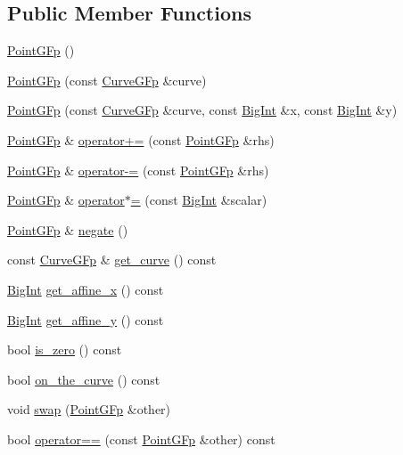 \subsection*{Public Member Functions}
\begin{DoxyCompactItemize}
\item 
\hyperlink{classBotan_1_1PointGFp_a49ca58fe99c847897ee6673cd90746d1}{Point\-G\-Fp} ()
\item 
\hyperlink{classBotan_1_1PointGFp_a056cdae379cb35122f78b4164c7d8d24}{Point\-G\-Fp} (const \hyperlink{classBotan_1_1CurveGFp}{Curve\-G\-Fp} \&curve)
\item 
\hyperlink{classBotan_1_1PointGFp_ac020476a17e80cf3fa3a43dbca5c1b20}{Point\-G\-Fp} (const \hyperlink{classBotan_1_1CurveGFp}{Curve\-G\-Fp} \&curve, const \hyperlink{classBotan_1_1BigInt}{Big\-Int} \&x, const \hyperlink{classBotan_1_1BigInt}{Big\-Int} \&y)
\item 
\hyperlink{classBotan_1_1PointGFp}{Point\-G\-Fp} \& \hyperlink{classBotan_1_1PointGFp_a2aa2c6b00aad016a98c9eef89f901403}{operator+=} (const \hyperlink{classBotan_1_1PointGFp}{Point\-G\-Fp} \&rhs)
\item 
\hyperlink{classBotan_1_1PointGFp}{Point\-G\-Fp} \& \hyperlink{classBotan_1_1PointGFp_a2130ed81ac7cc39079b972fc5a5c8a1d}{operator-\/=} (const \hyperlink{classBotan_1_1PointGFp}{Point\-G\-Fp} \&rhs)
\item 
\hyperlink{classBotan_1_1PointGFp}{Point\-G\-Fp} \& \hyperlink{classBotan_1_1PointGFp_acf39ed6f07151a990183f338c23728ef}{operator$\ast$=} (const \hyperlink{classBotan_1_1BigInt}{Big\-Int} \&scalar)
\item 
\hyperlink{classBotan_1_1PointGFp}{Point\-G\-Fp} \& \hyperlink{classBotan_1_1PointGFp_ad210a3ff92e42254174219a94e9d24c0}{negate} ()
\item 
const \hyperlink{classBotan_1_1CurveGFp}{Curve\-G\-Fp} \& \hyperlink{classBotan_1_1PointGFp_ae4987daa60ab927389320775da372d6a}{get\-\_\-curve} () const 
\item 
\hyperlink{classBotan_1_1BigInt}{Big\-Int} \hyperlink{classBotan_1_1PointGFp_a4dce1958aa0039c53ce449985d40b5f8}{get\-\_\-affine\-\_\-x} () const 
\item 
\hyperlink{classBotan_1_1BigInt}{Big\-Int} \hyperlink{classBotan_1_1PointGFp_a4d297de3c60438e7a13bc8c82f7737c4}{get\-\_\-affine\-\_\-y} () const 
\item 
bool \hyperlink{classBotan_1_1PointGFp_a335bfa1a7e86fef6965574db8df05f83}{is\-\_\-zero} () const 
\item 
bool \hyperlink{classBotan_1_1PointGFp_acf8e9728edbc7997d8680dab64959e19}{on\-\_\-the\-\_\-curve} () const 
\item 
void \hyperlink{classBotan_1_1PointGFp_a9f3de40f3b4553083f1d39b340954c41}{swap} (\hyperlink{classBotan_1_1PointGFp}{Point\-G\-Fp} \&other)
\item 
bool \hyperlink{classBotan_1_1PointGFp_a8f41f8414d4521df5bb631b62e86819b}{operator==} (const \hyperlink{classBotan_1_1PointGFp}{Point\-G\-Fp} \&other) const 
\end{DoxyCompactItemize}
